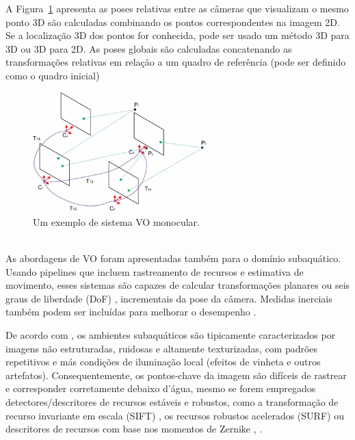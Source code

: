 A Figura~\ref{fig:Figures/MonocularVOSystem} apresenta as poses relativas entre as câmeras que visualizam o mesmo ponto 3D são calculadas combinando os pontos correspondentes na imagem 2D. Se a localização 3D dos pontos for conhecida, pode ser usado um método 3D para 3D ou 3D para 2D. As poses globais são calculadas concatenando as transformações relativas em relação a um quadro de referência (pode ser definido como o quadro inicial) \cite{yousif2015overview}
\ \\
\begin{figure}[!htb]
	\centering	
	\includegraphics[width=0.6\textwidth]{Figures/MonocularVOSystem.png}
	\caption{Um exemplo de sistema VO monocular.}
	\label{fig:Figures/MonocularVOSystem}
\end{figure}
\ \\
As abordagens de VO foram apresentadas também para o domínio subaquático. Usando pipelines que incluem rastreamento de recursos e estimativa de movimento, esses sistemas são capazes de calcular transformações planares \cite{huang2017visual} ou seis graus de liberdade (DoF) \cite{wirth2013visual}, \cite{corke2007experiments} incrementais da pose da câmera. Medidas inerciais também podem ser incluídas para melhorar o desempenho \cite{creuze2017monocular}.

De acordo com \cite{bellavia2017selective}, os ambientes subaquáticos são tipicamente caracterizados por imagens não estruturadas, ruidosas e altamente texturizadas, com padrões repetitivos e más condições de iluminação local (efeitos de vinheta e outros artefatos). Consequentemente, os pontos-chave da imagem são difíceis de rastrear e corresponder corretamente debaixo d'água, mesmo se forem empregados detectores/descritores de recursos estáveis e robustos, como a transformação de recurso invariante em escala (SIFT) \cite{lowe2004distinctive}, os recursos robustos acelerados (SURF) \cite{bay2006surf} ou descritores de recursos com base nos momentos de Zernike \cite{eustice2008visually}, \cite{kim2009pose}.

